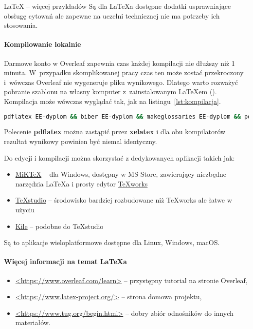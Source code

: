 \begin{easyappendix}{\LaTeX{} -- więcej przykładów}
Są dla \LaTeX{a} dostępne dodatki usprawniające obsługę cytowań ale zapewne na uczelni technicznej nie ma potrzeby ich stosowania.

\paragraph{Kompilowanie lokalnie}
Darmowe konto w Overleaf zapewnia czas każdej kompilacji nie dłuższy niż 1 minuta. W~przypadku skomplikowanej pracy czas ten może zostać przekroczony i~wówczas Overleaf nie wygeneruje pliku wynikowego. Dlatego warto rozważyć pobranie szablonu na własny komputer z~zainstalowanym \LaTeX{em} (). Kompilacja może wówczas wyglądać tak, jak na listingu~\ref{lst:kompilacja}.

\begin{lstlisting}[language=bash,
	caption={Kompilacja pracy dyplomowej lokalnie},
	label={lst:kompilacja}]
	pdflatex EE-dyplom && biber EE-dyplom && makeglossaries EE-dyplom && pdflatex EE-dyplom && pdflatex EE-dyplom
\end{lstlisting}

Polecenie \textbf{pdflatex} można zastąpić przez \textbf{xelatex} i dla obu kompilatorów rezultat wynikowy powinien być niemal identyczny.

Do edycji i kompilacji można skorzystać z dedykowanych aplikacji takich jak:
\begin{itemize}
	\item \href{https://miktex.org/}{MiKTeX} -- dla Windows, dostępny w MS Store, zawierający niezbędne narzędzia \LaTeX{a} i prosty edytor \href{https://www.tug.org/texworks/}{TeXworks}
	\item \href{https://www.texstudio.org/}{TeXstudio} -- środowisko bardziej rozbudowane niż TeXworks ale łatwe w użyciu
	\item \href{https://kile.sourceforge.io/}{Kile} -- podobne do TeXstudio
\end{itemize}

Są to aplikacje wieloplatformowe dostępne dla Linux, Windows, macOS.


\paragraph{Więcej informacji na temat \LaTeX{a}}
\begin{itemize}
	\item \href{https://www.overleaf.com/learn}{<https://www.overleaf.com/learn>} -- przystępny tutorial na stronie Overleaf,
	\item \href{https://www.latex-project.org/}{<https://www.latex-project.org/>} -- strona domowa projektu,
	\item \href{https://www.tug.org/begin.html}{<https://www.tug.org/begin.html>} -- dobry zbiór odnośników do innych materiałów.
\end{itemize}


\end{easyappendix}

